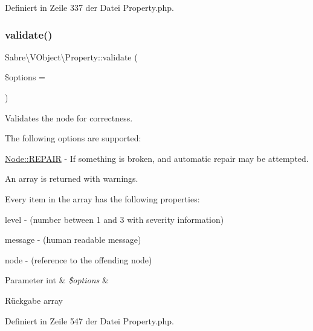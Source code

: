 Definiert in Zeile 337 der Datei Property.\+php.

\mbox{\label{class_sabre_1_1_v_object_1_1_property_a8e45ac8956838485e7a66111dfe3c2fc}} 
\subsubsection{\texorpdfstring{validate()}{validate()}}
{\footnotesize\ttfamily Sabre\textbackslash{}\+V\+Object\textbackslash{}\+Property\+::validate (\begin{DoxyParamCaption}\item[{}]{\$options = {} }\end{DoxyParamCaption})}

Validates the node for correctness.

The following options are supported\+:
\begin{DoxyItemize}
\item \mbox{\hyperlink{class_sabre_1_1_v_object_1_1_node_ac97a7fb85c1f871523336cd1ec6b29a9}{Node\+::\+R\+E\+P\+A\+IR}} -\/ If something is broken, and automatic repair may be attempted.
\end{DoxyItemize}

An array is returned with warnings.

Every item in the array has the following properties\+:
\begin{DoxyItemize}
\item level -\/ (number between 1 and 3 with severity information)
\item message -\/ (human readable message)
\item node -\/ (reference to the offending node)
\end{DoxyItemize}


\begin{DoxyParams}[1]{Parameter}
int & {\em \$options} & \\
\hline
\end{DoxyParams}
\begin{DoxyReturn}{Rückgabe}
array 
\end{DoxyReturn}


Definiert in Zeile 547 der Datei Property.\+php.

\mbox{\label{class_sabre_1_1_v_object_1_1_property_a8b031a1e263d892c08d87b47a1d4e94f}} 
